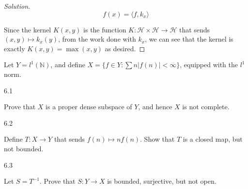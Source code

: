 \documentclass[10pt]{article}
\newenvironment{problem}[2][]{\begin{trivlist}
\item[\hskip \labelsep {\bfseries #1}\hskip \labelsep {\bfseries #2.}]}{\end{trivlist}}
\begin{document}
\begin{proof}[Solution]
$$ f(x) = \langle f, k_x \rangle $$

Since the kernel $K(x,y)$ is the function $K: \mathcal{H} \times \mathcal{H}  \to \mathcal{H}$ that sends $(x,y) \mapsto k_x(y)$, from the work done with $k_x$, we can see that the kernel is exactly $K(x,y)= \max(x,y)$ as desired.

\end{proof}

\begin{problem}{Question 6}

Let $Y = l^1(\mathbb{N})$, and define $X = \{ f \in Y : \sum n |f(n)| < \infty \}$, equipped with the $l^1$ norm.

6.1

Prove that $X$ is a proper dense subspace of $Y$, and hence $X$ is not complete. 

6.2

Define $T: X \to Y$ that sends $f(n) \mapsto nf(n)$. Show that $T$ is a closed map, but not bounded.

6.3

Let $S = T^{-1}$. Prove that $S: Y \to X$ is bounded, surjective, but not open.

\end{problem}
\end{document}
